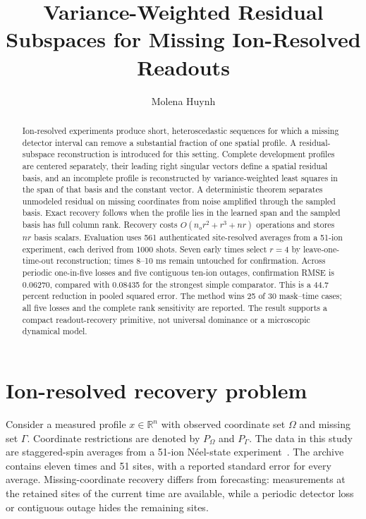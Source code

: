 \documentclass[10pt,letterpaper,twoside]{article}
\newcommand{\R}{\mathbb{R}}
\begin{document}
\title{Variance-Weighted Residual Subspaces for Missing Ion-Resolved Readouts}
\author{Molena Huynh}

\maketitle

\begin{abstract}
Ion-resolved experiments produce short, heteroscedastic sequences for which a
missing detector interval can remove a substantial fraction of one spatial
profile. A residual-subspace reconstruction is introduced for this setting.
Complete development profiles are centered separately, their leading right
singular vectors define a spatial residual basis, and an incomplete profile is
reconstructed by variance-weighted least squares in the span of that basis and
the constant vector. A deterministic theorem separates unmodeled residual on
missing coordinates from noise amplified through the sampled basis. Exact
recovery follows when the profile lies in the learned span and the sampled
basis has full column rank. Recovery costs $O(n_o r^2+r^3+nr)$ operations and
stores $nr$ basis scalars. Evaluation uses 561 authenticated site-resolved
averages from a 51-ion experiment, each derived from 1000 shots. Seven early
times select $r=4$ by leave-one-time-out reconstruction; times 8--10 ms remain
untouched for confirmation. Across periodic one-in-five losses and five
contiguous ten-ion outages, confirmation RMSE is 0.06270, compared with
0.08435 for the strongest simple comparator. This is a 44.7 percent reduction
in pooled squared error. The method wins 25 of 30 mask--time cases; all five
losses and the complete rank sensitivity are reported. The result supports a
compact readout-recovery primitive, not universal dominance or a microscopic
dynamical model.
\end{abstract}

\section{Ion-resolved recovery problem}

Consider a measured profile $x\in\R^n$ with observed coordinate set
$\Omega$ and missing set $\Gamma$. Coordinate restrictions are denoted by
$P_\Omega$ and $P_\Gamma$. The data in this study are staggered-spin averages
from a 51-ion N\'eel-state experiment~\cite{joshi2025data,kraft2025beqs}.
The archive contains eleven times and 51 sites, with a reported standard error
for every average. Missing-coordinate recovery differs from forecasting:
measurements at the retained sites of the current time are available, while a
periodic detector loss or contiguous outage hides the remaining sites.
\end{document}
